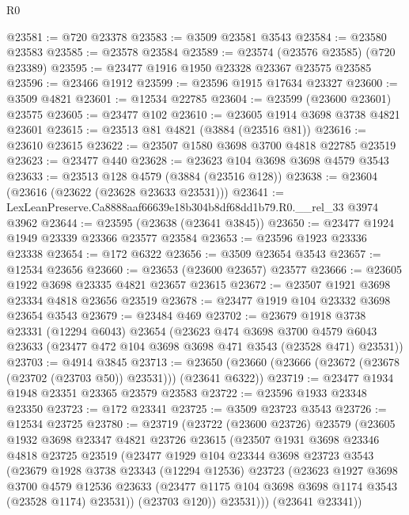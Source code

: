 \begin{lexlean}{R0}
\begin{coremodule}
@23581 := @720 @23378
@23583 := @3509 @23581 @3543
@23584 := @23580 @23583
@23585 := @23578 @23584
@23589 := @23574 (@23576 @23585) (@720 @23389)
@23595 := @23477 @1916 @1950 @23328 @23367 @23575 @23585
@23596 := @23466 @1912
@23599 := @23596 @1915 @17634 @23327
@23600 := @3509 @4821
@23601 := @12534 @22785
@23604 := @23599 (@23600 @23601) @23575
@23605 := @23477 @102
@23610 := @23605 @1914 @3698 @3738 @4821 @23601
@23615 := @23513 @81 @4821 (@3884 (@23516 @81))
@23616 := @23610 @23615
@23622 := @23507 @1580 @3698 @3700 @4818 @22785 @23519
@23623 := @23477 @440
@23628 := @23623 @104 @3698 @3698 @4579 @3543
@23633 := @23513 @128 @4579 (@3884 (@23516 @128))
@23638 := @23604 (@23616 (@23622 (@23628 @23633 @23531)))
@23641 := LexLeanPreserve.Ca8888aaf66639e18b304b8df68dd1b79.R0.__rel_33 @3974 @3962
@23644 := @23595 (@23638 (@23641 @3845))
@23650 := @23477 @1924 @1949 @23339 @23366 @23577 @23584
@23653 := @23596 @1923 @23336 @23338
@23654 := @172 @6322
@23656 := @3509 @23654 @3543
@23657 := @12534 @23656
@23660 := @23653 (@23600 @23657) @23577
@23666 := @23605 @1922 @3698 @23335 @4821 @23657 @23615
@23672 := @23507 @1921 @3698 @23334 @4818 @23656 @23519
@23678 := @23477 @1919 @104 @23332 @3698 @23654 @3543
@23679 := @23484 @469
@23702 := @23679
    @1918
    @3738
    @23331
    (@12294 @6043)
    @23654
    (@23623
      @474
      @3698
      @3700
      @4579
      @6043
      @23633
      (@23477 @472 @104 @3698 @3698 @471 @3543 (@23528 @471) @23531))
@23703 := @4914 @3845
@23713 := @23650 (@23660 (@23666 (@23672 (@23678 (@23702 (@23703 @50)) @23531))) (@23641 @6322))
@23719 := @23477 @1934 @1948 @23351 @23365 @23579 @23583
@23722 := @23596 @1933 @23348 @23350
@23723 := @172 @23341
@23725 := @3509 @23723 @3543
@23726 := @12534 @23725
@23780 := @23719
    (@23722
      (@23600 @23726)
      @23579
      (@23605
        @1932
        @3698
        @23347
        @4821
        @23726
        @23615
        (@23507
          @1931
          @3698
          @23346
          @4818
          @23725
          @23519
          (@23477
            @1929
            @104
            @23344
            @3698
            @23723
            @3543
            (@23679
              @1928
              @3738
              @23343
              (@12294 @12536)
              @23723
              (@23623
                @1927
                @3698
                @3700
                @4579
                @12536
                @23633
                (@23477 @1175 @104 @3698 @3698 @1174 @3543 (@23528 @1174) @23531))
              (@23703 @120))
            @23531)))
      (@23641 @23341))

\end{coremodule}
\end{lexlean}
